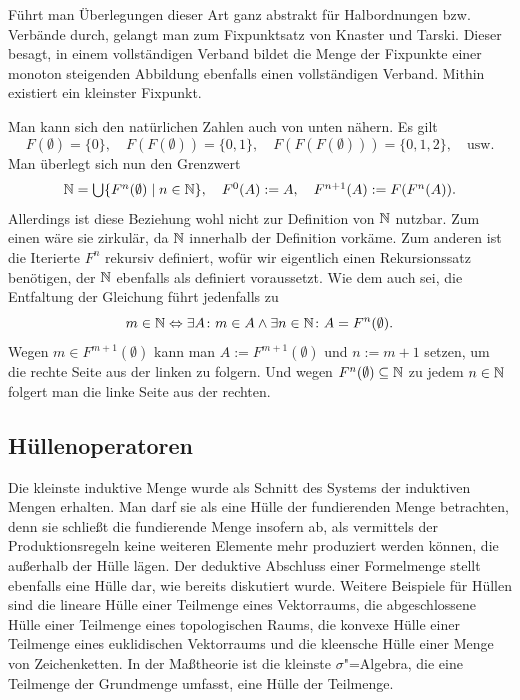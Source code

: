 Führt man Überlegungen dieser Art ganz abstrakt für Halbordnungen
bzw. Verbände durch, gelangt man zum Fixpunktsatz von Knaster und
Tarski. Dieser besagt, in
einem vollständigen Verband bildet die Menge der Fixpunkte einer monoton
steigenden Abbildung ebenfalls einen vollständigen Verband. Mithin
existiert ein kleinster Fixpunkt.

Man kann sich den natürlichen Zahlen auch von unten nähern. Es gilt
\[F(\emptyset) = \{0\},\quad F(F(\emptyset)) = \{0,1\},\quad
F(F(F(\emptyset))) = \{0,1,2\},\quad\text{usw.}\]
Man überlegt sich nun den Grenzwert
\[\textstyle\mathbb N = \bigcup\{F^n(\emptyset)\mid n\in\mathbb N\},\quad
F^0(A):=A,\quad F^{n+1}(A) := F(F^n(A)).\]
Allerdings ist diese Beziehung wohl nicht zur Definition von
$\mathbb N$ nutzbar. Zum einen wäre sie zirkulär, da $\mathbb N$ innerhalb der
Definition vorkäme. Zum anderen ist die Iterierte $F^n$ rekursiv
definiert, wofür wir eigentlich einen Rekursionssatz benötigen, der
$\mathbb N$ ebenfalls als definiert voraussetzt. Wie dem auch sei, die
Entfaltung der Gleichung führt jedenfalls zu
\[m\in\mathbb N \Leftrightarrow \exists A\colon m\in A\land\exists n\in\mathbb N\colon A=F^n(\emptyset).\]
Wegen $m\in F^{m+1}(\emptyset)$ kann man $A:=F^{m+1}(\emptyset)$
und $n:=m+1$ setzen, um die rechte Seite aus der linken zu folgern.
Und wegen $F^n(\emptyset)\subseteq\mathbb N$ zu jedem $n\in\mathbb N$ folgert man
die linke Seite aus der rechten.

\subsection{Hüllenoperatoren}

Die kleinste induktive Menge wurde als Schnitt des Systems
der induktiven Mengen erhalten. Man darf sie als eine Hülle der
fundierenden Menge betrachten, denn sie schließt die fundierende Menge
insofern ab, als vermittels der Produktionsregeln keine weiteren
Elemente mehr produziert werden können, die außerhalb der Hülle lägen.
Der deduktive Abschluss einer Formelmenge stellt ebenfalls eine Hülle dar,
wie bereits diskutiert wurde.
Weitere Beispiele für Hüllen sind die lineare Hülle einer Teilmenge
eines Vektorraums, die abgeschlossene Hülle einer Teilmenge eines
topologischen Raums, die konvexe Hülle einer Teilmenge eines euklidischen
Vektorraums und die kleensche Hülle einer Menge von Zeichenketten. In
der Maßtheorie ist die kleinste $\sigma$"=Algebra, die eine Teilmenge der
Grundmenge umfasst, eine Hülle der Teilmenge.


